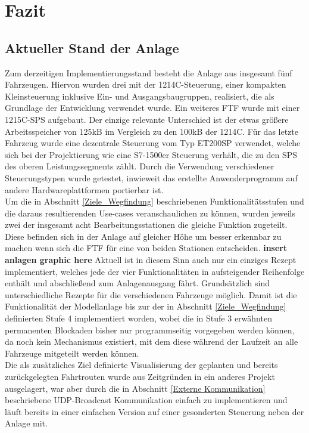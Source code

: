 \chapter{Fazit}

\section{Aktueller Stand der Anlage}
	\label{Stand}
	Zum derzeitigen Implementierungsstand besteht die Anlage aus insgesamt fünf Fahrzeugen. Hiervon wurden drei mit der 1214C-Steuerung, einer kompakten Kleinsteuerung inklusive Ein- und Ausgangsbaugruppen, realisiert, die als Grundlage der Entwicklung verwendet wurde. Ein weiteres \ac{FTF} wurde mit einer 1215C-\ac{SPS} aufgebaut. Der einzige relevante Unterschied ist der etwas größere Arbeitsspeicher von 125kB im Vergleich zu den 100kB der 1214C. Für das letzte Fahrzeug wurde eine dezentrale Steuerung vom Typ ET200SP verwendet, welche sich bei der Projektierung wie eine S7-1500er Steuerung verhält, die zu den \ac{SPS} des oberen Leistungssegments zählt. Durch die Verwendung verschiedener Steuerungstypen wurde getestet, inwieweit das erstellte Anwenderprogramm auf andere Hardwareplattformen portierbar ist. 
	\\[4pt]
	Um die in Abschnitt \ref{Ziele_Wegfindung} beschriebenen Funktionalitätsstufen und die daraus resultierenden Use-cases veranschaulichen zu können, wurden jeweils zwei der insgesamt acht Bearbeitungsstationen die gleiche Funktion zugeteilt. Diese befinden sich in der Anlage auf gleicher Höhe um besser erkennbar zu machen wenn sich die \ac{FTF} für eine von beiden Stationen entscheiden. \textbf{insert anlagen graphic here} Aktuell ist in diesem Sinn auch nur ein einziges Rezept implementiert, welches jede der vier Funktionalitäten in aufsteigender Reihenfolge enthält und abschließend zum Anlagenausgang fährt. Grundsätzlich sind unterschiedliche Rezepte für die verschiedenen Fahrzeuge möglich. Damit ist die Funktionalität der Modellanlage bis zur der in Abschnitt \ref{Ziele_Wegfindung} definierten Stufe 4 implementiert worden, wobei die in Stufe 3 erwähnten permanenten Blockaden bisher nur programmseitig vorgegeben werden können, da noch kein Mechanismus existiert, mit dem diese während der Laufzeit an alle Fahrzeuge mitgeteilt werden können.
	\\[4pt]
	Die als zusätzliches Ziel definierte Visualisierung der geplanten und bereits zurückgelegten Fahrtrouten wurde aus Zeitgründen in ein anderes Projekt ausgelagert, war aber durch die in Abschnitt \ref{Externe Kommunikation} beschriebene \ac{UDP}-Broadcast Kommunikation einfach zu implementieren und läuft bereits in einer einfachen Version auf einer gesonderten Steuerung neben der Anlage mit.
	
